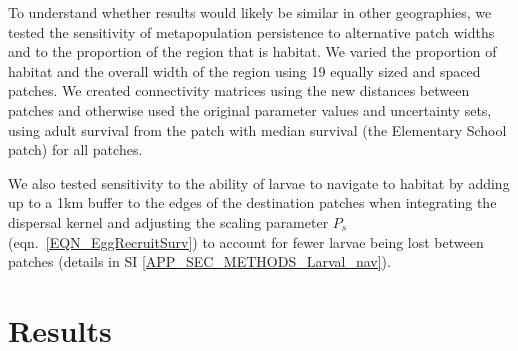 \documentclass[12pt, oneside]{article}   	%
\begin{document}
To understand whether results would likely be similar in other geographies, we tested the sensitivity of metapopulation persistence to alternative patch widths and to the proportion of the region that is habitat. We varied the proportion of habitat and the overall width of the region using 19 equally sized and spaced patches. We created connectivity matrices using the new distances between patches and otherwise used the original parameter values and uncertainty sets, using adult survival from the patch with median survival (the Elementary School patch) for all patches.

We also tested sensitivity to the ability of larvae to navigate to habitat by adding up to a 1km buffer to the edges of the destination patches when integrating the dispersal kernel and adjusting the scaling parameter $P_s$ (eqn.\ \ref{EQN_EggRecruitSurv}) to account for fewer larvae being lost between patches (details in SI \ref{APP_SEC_METHODS_Larval_nav}).

\section*{Results} %


\end{document}
